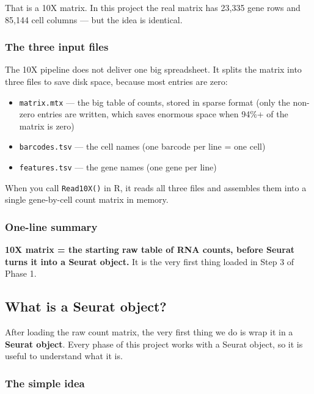 \documentclass[11pt, a4paper]{article}
\begin{document}
That is a 10X matrix. In this project the real matrix has 23,335 gene rows and
85,144 cell columns — but the idea is identical.

\subsubsection{The three input files}

The 10X pipeline does not deliver one big spreadsheet. It splits the matrix into
three files to save disk space, because most entries are zero:

\begin{itemize}[nosep]
  \item \texttt{matrix.mtx} — the big table of counts, stored in sparse format
        (only the non-zero entries are written, which saves enormous space when
        94\%+ of the matrix is zero)
  \item \texttt{barcodes.tsv} — the cell names (one barcode per line = one cell)
  \item \texttt{features.tsv} — the gene names (one gene per line)
\end{itemize}

When you call \texttt{Read10X()} in R, it reads all three files and assembles them
into a single gene-by-cell count matrix in memory.

\subsubsection{One-line summary}

\textbf{10X matrix = the starting raw table of RNA counts, before Seurat turns it
into a Seurat object.} It is the very first thing loaded in Step 3 of Phase 1.

\subsection{What is a Seurat object?}

After loading the raw count matrix, the very first thing we do is wrap it in a
\textbf{Seurat object}. Every phase of this project works with a Seurat object,
so it is useful to understand what it is.

\subsubsection{The simple idea}
\end{document}
